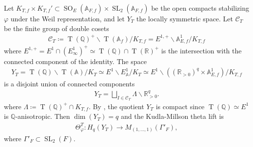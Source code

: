 \documentclass[11pt]{article} %
\newcommand{\8}{\infty}
\newcommand{\Tbf}{\operatorname{T}}
\newcommand{\SO}{\operatorname{SO}}
\newcommand{\SL}{\operatorname{SL}}
\newcommand{\R}{\mathbb{R}}
\newcommand{\A}{\mathbb{A}}
\newcommand{\Q}{\mathbb{Q}}
\newcommand{\Ccal}{\mathcal{C}}
\newcommand{\fin}{f}
\theoremstyle{mytheoremstyle}
\theoremstyle{remark}
\numberwithin{equation}{section}
\begin{document}
Let $K_{T,\fin} \times K_{T,\fin}' \subset \SO_E(\A_{F,\fin}) \times \SL_2(\A_{F,\fin})$ be the open compacts stabilizing $\varphi$ under the Weil representation, and let $Y_T$ the locally symmetric space. 
Let $\Ccal_T$ be the finite group of double cosets
\begin{align}
    \Ccal_T \coloneqq \Tbf(\Q)^+\backslash \Tbf(\A_\fin)/K_{T,\fin}=E^{1,+} \backslash \A_{E,\fin}^1/K_{T,\fin}
\end{align}
where $E^{1,+}= E^1 \cap (E^1_\8)^+ \simeq \Tbf(\Q) \cap \Tbf(\R)^+$ is the intersection with the connected component of the identity. The space
\begin{align}
    Y_T=\Tbf(\Q)\backslash \Tbf(\A)/K_{T} \simeq E^1 \backslash E^1_\A/K_T \simeq E^1 \backslash \left ( (\R_{>0})^{q} \times \A_{E,\fin}^1 \right )/K_{T,\fin}
\end{align}
is a disjoint union of connected components
\begin{align} \label{cup1}
    Y_T=\bigsqcup_{I \in \Ccal_T} \Lambda \backslash \R_{>0}^{q}.
\end{align}
where $\Lambda \coloneqq \Tbf(\Q)^+ \cap K_{T,\fin}$. By \cite[Theorem.~4.11, p.~208]{pr}, the quotient $Y_{T}$ is compact since $\Tbf(\Q) \simeq E^1$ is $\Q$-anisotropic. Then $\dim(Y_T)={q}$ and the Kudla-Millson theta lift is
\begin{align} \label{lift1}
    \Theta^T_{\varphi}\colon H_{q}(Y_T) \longrightarrow M_{(1,\dots,1)}( \Gamma'_F),
\end{align}
where $\Gamma'_F \subset \SL_2(F)$.
\end{document}
